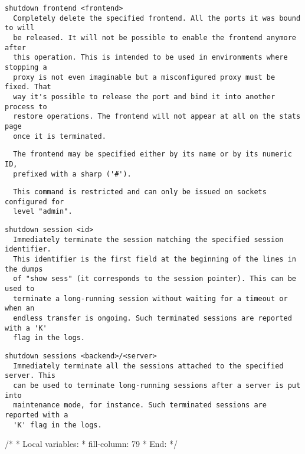 \begin{verbatim}
shutdown frontend <frontend>
  Completely delete the specified frontend. All the ports it was bound to will
  be released. It will not be possible to enable the frontend anymore after
  this operation. This is intended to be used in environments where stopping a
  proxy is not even imaginable but a misconfigured proxy must be fixed. That
  way it's possible to release the port and bind it into another process to
  restore operations. The frontend will not appear at all on the stats page
  once it is terminated.
\end{verbatim}

\begin{verbatim}
  The frontend may be specified either by its name or by its numeric ID,
  prefixed with a sharp ('#').
\end{verbatim}

\begin{verbatim}
  This command is restricted and can only be issued on sockets configured for
  level "admin".
\end{verbatim}

\begin{verbatim}
shutdown session <id>
  Immediately terminate the session matching the specified session identifier.
  This identifier is the first field at the beginning of the lines in the dumps
  of "show sess" (it corresponds to the session pointer). This can be used to
  terminate a long-running session without waiting for a timeout or when an
  endless transfer is ongoing. Such terminated sessions are reported with a 'K'
  flag in the logs.
\end{verbatim}

\begin{verbatim}
shutdown sessions <backend>/<server>
  Immediately terminate all the sessions attached to the specified server. This
  can be used to terminate long-running sessions after a server is put into
  maintenance mode, for instance. Such terminated sessions are reported with a
  'K' flag in the logs.
\end{verbatim}


/*
 * Local variables:
 *  fill-column: 79
 * End:
 */


